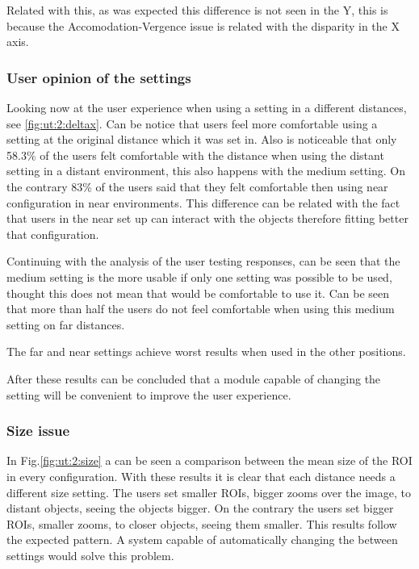 \documentclass[10pt,a4paper,twocolumn,twoside]{article}
\begin{document}
	Related with this, as was expected this difference is not seen in the Y, this is because the Accomodation-Vergence issue is related with the disparity in the X axis. 
	
	\subsubsection{User opinion of the settings }
	Looking now at the user experience when using a setting in a different distances, see \ref{fig:ut:2:deltax}. Can be notice that users feel more comfortable using a setting at the original distance which it was set in. Also is noticeable that only 58.3\% of the users felt comfortable with the distance when using the distant setting in a distant environment, this also happens with the medium setting. On the contrary 83\% of the users said that they felt comfortable then using near configuration in near environments. This difference can be related with the fact that users in the near set up can interact with the objects therefore fitting better that configuration. 
	
	Continuing with the analysis of the user testing responses, can be seen that the medium setting is the more usable if only one setting was possible to be used, thought this does not mean that would be comfortable to use it. Can be seen that more than half the users do not feel comfortable when using this medium setting on far distances.  
	
	The far and near settings achieve worst results when used in the other positions. 
	
	After these results can be concluded that a module capable of changing the setting will be convenient to improve the user experience. 
	
	\subsubsection{Size issue}
	
	In Fig.\ref{fig:ut:2:size} a can be seen a comparison between the mean size of the ROI in every configuration. With these results it is clear that each distance needs a different size setting.  The users set smaller ROIs, bigger zooms over the image, to distant objects, seeing the objects bigger. On the contrary the users set bigger ROIs, smaller zooms, to closer objects, seeing them smaller. This results follow the expected pattern. A system capable of automatically changing the between settings would solve this problem. 
	
\end{document}
